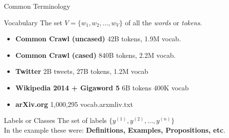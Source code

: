 \documentclass{beamer}
\begin{document}
\begin{frame}{Common Terminology}
    \begin{exampleblock}{Vocabulary}
        The set $V = \{w_1,w_2,\ldots, w_V\}$ of all the \textit{words} or \textit{tokens}.
    \end{exampleblock}
        \begin{itemize}
            \item \textbf{Common Crawl (uncased)} 42B tokens, 1.9M vocab.
            \item \textbf{Common Crawl (cased)} 840B tokens, 2.2M vocab.
            \item \textbf{Twitter} 2B tweets, 27B tokens, 1.2M vocab
            \item \textbf{Wikipedia 2014 + Gigaword 5} 6B tokens 400K vocab
            \item \textbf{arXiv.org} 1,000,295 vocab.arxmliv.txt
        \end{itemize}

        \begin{exampleblock}{Labels or Classes}
            The set of labels $\{y^{(1)},y^{(2)},\ldots, y^{(n)}\}$\\
            In the example these were: \textbf{Definitions, Examples, Propositions, etc}.
        \end{exampleblock}


\end{frame}
\end{document}
